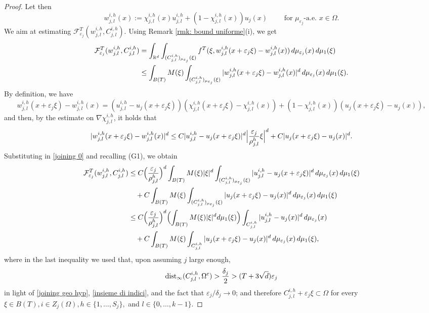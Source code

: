 \documentclass{article}
\theoremstyle{plain}
\theoremstyle{definition}
\newcommand{\ej}{\varepsilon_j}
\newcommand{\dej}{\delta_j}
\newcommand{\F}{\mathcal{F}}
\numberwithin{equation}{section}
\begin{document}
\begin{proof}
Let then
\begin{equation*}
    w_{j,l}^{i,h}(x):=\chi^{i,h}_{j,l}(x)u_{j,l}^{i,h}+(1-\chi^{i,h}_{j,l}(x))u_j(x) \qquad \text{ for } \mu_{\ej}\text{-a.e. } x\in\Omega.
\end{equation*}
We aim at estimating $\F^T_{\ej}(w_{j,l}^{i,h},C^{i, h}_{j,l})$. Using Remark \ref{rmk: bound uniforme}(i), we get
\begin{align}\notag
    \F^T_{\ej}(w_{j,l}^{i,h},C^{i, h}_{j,l}) & = \int_{\mathbb{R}^d}\int_{(C^{i, h}_{j,l})_{\mu_{\ej}}(\xi)}f^T(\xi,w^{i,h}_{j,l}(x+\ej\xi)-w^{i,h}_{j,l}(x)) \,d\mu_{\ej}(x)\, d\mu_1(\xi)\\ \label{joining 0}
    & \leq \int_{B(T)}M(\xi)\int_{(C^{i, h}_{j,l})_{\mu_{\ej}}(\xi)}|w^{i,h}_{j,l}(x+\ej\xi)-w^{i,h}_{j,l}(x)|^d\,d\mu_{\ej}(x)\, d\mu_1(\xi).
\end{align}
By definition, we have
\begin{equation*}
   w^{i,h}_{j,l}(x+\ej\xi)-w^{i,h}_{j,l}(x)=(u_{j,l}^{i,h}-u_j(x+\ej\xi)) (\chi^{i,h}_{j,l}(x+\ej\xi)-\chi^{i,h}_{j,l}(x))+(1-\chi^{i,h}_{j,l}(x))(u_{j}(x+\ej\xi)-u_j(x)),
\end{equation*}
and then, by the estimate on $\nabla \chi^{i,h}_{j,l}$, it holds that
\begin{align*}
   | w^{i,h}_{j,l}(x+\ej\xi)-w^{i,h}_{j,l}(x)|^d \leq C |u_{j,l}^{i,h}-u_j(x+\ej\xi)|^d\Bigl|    \frac{\ej}{\rho^{h}_{j,l}}\xi\Bigr|^{d} +  C|u_{j}(x+\ej\xi)-u_{j}(x)|^d. 
\end{align*}
Substituting in \eqref{joining 0} and recalling (G1), we obtain
\begin{align} \notag
     \F^T_{\ej}(w_{j,l}^{i,h},C^{i, h}_{j,l}) & \leq C\Bigl(\frac{\ej}{\rho^{h}_{j,l} }\Bigr)^d\int_{B(T)}M(\xi)|\xi|^d\int_{(C^{i, h}_{j,l})_{\mu_{\ej}}(\xi)}|u_{j,l}^{i,h}-u_j(x+\ej\xi)|^d\, d\mu_{\ej}(x)\, d\mu_1(\xi) \\ \notag
     & \quad+  C\int_{ B(T)}M(\xi)\int_{(C^{i, h}_{j,l})_{\mu_{\ej}}(\xi)}|u_{j}(x+\ej\xi)-u_{j}(x)|^d\, d\mu_{\ej}(x)\, d\mu_1(\xi) \\ \notag
     &  \leq C\Bigl(\frac{\ej}{\rho^{h}_{j,l} }\Bigr)^d\Bigl(\int_{B(T)}M(\xi)|\xi|^dd\mu_1(\xi)\Bigr)\int_{ C^{i, h}_{j,l}}|u_{j,l}^{i,h}-u_j(x)|^d\,d\mu_{\ej}(x) \\ \label{joining 1} 
     & \quad+  C\int_{ B(T)}M(\xi)\int_{C^{i, h}_{j,l}}|u_{j}(x+\ej\xi)-u_{j}(x)|^d\, d\mu_{\ej}(x)\, d\mu_1(\xi),
     \end{align}
where in the last inequality we used that, upon assuming $j$ large enough,
\begin{equation}\label{distanza per long-range}
    \text{\rm dist}
_\infty(C_{j,l}^{i,h}, \Omega^c)>\frac{\dej}{2}>(T+3\sqrt{d})\ej
\end{equation}
in light of \eqref{joining geo hyp}, \eqref{insieme di indici}, and the fact that $\ej/\dej\to0$; and therefore $C^{i,h}_{j,l}+\ej\xi\subset \Omega$ for every $\xi\in B(T), i\in Z_j(\Omega), h\in\{1,\dots,S_j\},$ and $l\in\{0,\dots,k-1\}$. 


\end{proof}
\end{document}
